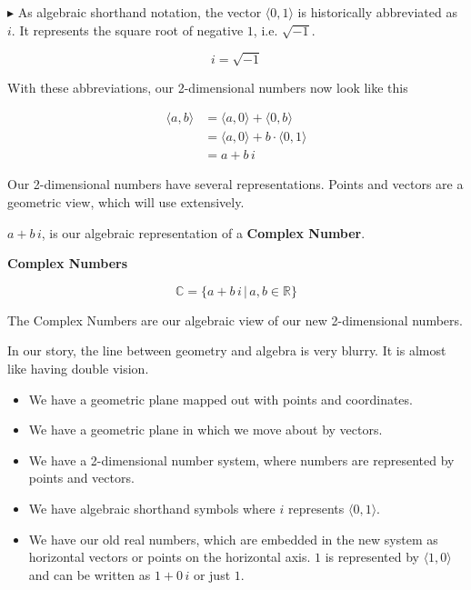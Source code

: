 \documentclass{ximera}
\begin{document}
$\blacktriangleright$  As algebraic shorthand notation, the vector $ \langle 0, 1 \rangle $ is historically abbreviated as $i$.  It represents the square root of negative $1$, i.e. $\sqrt{-1}$.


\[ i = \sqrt{-1}\]

With these abbreviations, our 2-dimensional numbers now look like this


\begin{align*}
\langle a, b \rangle & = \langle a, 0 \rangle + \langle 0, b \rangle  \\
         & = \langle a, 0 \rangle + b \cdot \langle 0, 1 \rangle  \\
          & = a + b \, i
\end{align*}




Our 2-dimensional numbers have several representations.  Points and vectors are a geometric view, which will use extensively.


 $a + b \, i$, is our algebraic representation of a \textbf{Complex Number}. 







\begin{definition}  \textbf{\textcolor{green!50!black}{Complex Numbers}}  


\[   \mathbb{C}  = \{  a + b \, i   \, | \, a, b \in \mathbb{R}   \} \]


\end{definition}













The Complex Numbers are our algebraic view of our new 2-dimensional numbers.  

In our story, the line between geometry and algebra is very blurry. It is almost like having double vision.  


\begin{itemize}
\item We have a geometric plane mapped out with points and coordinates.
\item We have a geometric plane in which we move about by vectors.
\item We have a 2-dimensional number system, where numbers are represented by points and vectors.
\item We have algebraic shorthand symbols where $i$ represents $\langle 0, 1 \rangle$.
\item We have our old real numbers, which are embedded in the new system as horizontal vectors or points on the horizontal axis. $1$ is represented by $\langle 1, 0 \rangle$ and can be written as $1 + 0 \, i$ or just $1$.
\end{itemize}
\end{document}
